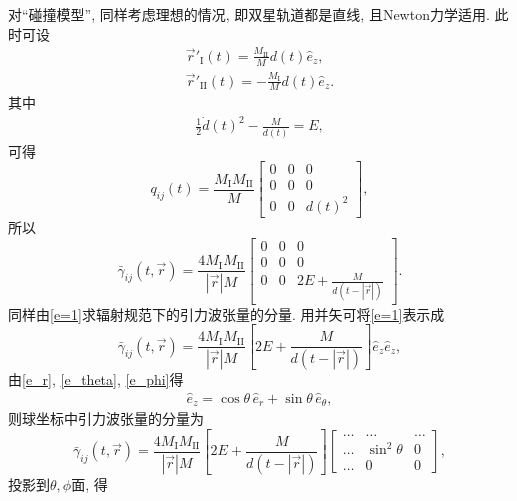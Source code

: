\documentclass[12pt]{ctexart}
\begin{document}
对``碰撞模型'', 同样考虑理想的情况, 即双星轨道都是直线, 且Newton力学适用. 此时可设
\begin{align}
    \vec{r}'_\text{I}(t)=\frac{M_\text{II}}{M}d(t)\hat{e}_z,\\
    \vec{r}'_\text{II}(t)=-\frac{M_\text{I}}{M}d(t)\hat{e}_z.
\end{align}
其中
\begin{align}
    \frac{1}{2}\dot{d}(t)^2-\frac{M}{d(t)}=E,
\end{align}
可得
\begin{equation}
    {q}_{ij}(t)=\frac{M_\text{I}M_\text{II}}{M}\begin{bmatrix}
        0&0&0\\
        0&0&0\\
        0&0&d(t)^2
    \end{bmatrix},
\end{equation}
所以
\begin{equation}
    \bar{\gamma}_{ij}(t,\vec{r})=\frac{4M_\text{I}M_\text{II}}{\left\lvert\vec{r}\right\rvert M}\begin{bmatrix}
        0&0&0\\
        0&0&0\\
        0&0&2E+\frac{M}{d(t-\left\lvert\vec{r}\right\rvert)}
    \end{bmatrix}.\label{e=1}
\end{equation}
同样由\eqref{e=1}求辐射规范下的引力波张量的分量. 用并矢可将\eqref{e=1}表示成
\begin{equation}
    \bar{\gamma}_{ij}(t,\vec{r})=\frac{4M_\text{I}M_\text{II}}{\left\lvert\vec{r}\right\rvert M}\left[2E+\frac{M}{d(t-\left\lvert\vec{r}\right\rvert)}\right]\hat{e}_z\hat{e}_z,
\end{equation}
由\eqref{e_r}, \eqref{e_theta}, \eqref{e_phi}得
\begin{align}
    \hat{e}_z=\cos\theta\,\hat{e}_r+\sin\theta\,\hat{e}_\theta,
\end{align}
则球坐标中引力波张量的分量为
\begin{equation}
    \bar{\gamma}_{ij}(t,\vec{r})=\frac{4M_\text{I}M_\text{II}}{\left\lvert\vec{r}\right\rvert M}\left[2E+\frac{M}{d(t-\left\lvert\vec{r}\right\rvert)}\right]
    \begin{bmatrix}
        \dots&\dots&\dots\\
        \dots&\sin^2\theta&0\\
        \dots&0&0
    \end{bmatrix},
\end{equation}
投影到$\theta,\phi$面, 得
\end{document}
